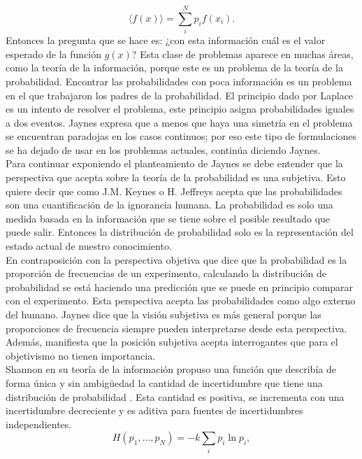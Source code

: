 \begin{equation}
\langle f(x) \rangle =\sum_{i}^{N} p_{i} f(x_{i}).
\end{equation}
Entonces la pregunta que se hace es: ¿con esta información cuál es el valor esperado de la función $g(x)$? Esta clase de problemas aparece en muchas áreas, como la teoría de la información, porque este es un problema de la teoría de la probabilidad. Encontrar las probabilidades con poca información es un problema en el que trabajaron los padres de la probabilidad. El principio dado por Laplace es un intento de resolver el problema, este principio asigna probabilidades iguales a dos eventos. Jaynes expresa que a menos que haya una simetría en el problema se encuentran paradojas en los casos continuos; por eso este tipo de formulaciones se ha dejado de usar en los problemas actuales, continúa diciendo Jaynes.
\\
Para continuar exponiendo el planteamiento de Jaynes se debe entender que la perspectiva que acepta sobre la teoría de la probabilidad es una subjetiva. Esto quiere decir que como J.M. Keynes o H. Jeffreys acepta que las probabilidades son una cuantificación de la ignorancia humana. La probabilidad es solo una medida basada en la información que se tiene sobre el posible resultado que puede salir. Entonces la distribución de probabilidad solo es la representación del estado actual de nuestro conocimiento. \\
En contraposición con la perspectiva objetiva que dice que la probabilidad es la proporción de frecuencias de un experimento, calculando la distribución de probabilidad se está haciendo una predicción que se puede en principio comparar con el experimento. Esta perspectiva acepta las probabilidades como algo externo del humano. Jaynes dice que la visión subjetiva es más general porque las proporciones de frecuencia siempre pueden interpretarse desde esta perspectiva. Además, manifiesta que la posición subjetiva acepta interrogantes que para el objetivismo no tienen importancia.
\\
Shannon en su teoría de la información propuso una función que describía de forma única y sin ambigüedad la cantidad de incertidumbre que tiene una distribución de probabilidad \cite{ShannonInformation}. Esta cantidad es positiva, se incrementa con una incertidumbre decreciente y es aditiva para fuentes de incertidumbres independientes.
\begin{equation}
H(p_{1},...,p_{N})=-k \sum_{i} p_{i} \ln p_{i},
\end{equation}
